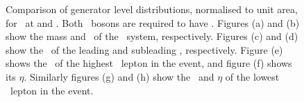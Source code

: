 \begin{figure}
{    }
        \vspace{-2mm}
        \vspace{-2mm}
    \caption[Comparison of generator level distributions, normalised to
    unit area, for \ZZllll\ at  and
    .]{\small Comparison of generator level distributions, normalised to
    unit area, for \ZZllll\ at  and
    . Both \Z\ bosons are required to have \sstooosZ. Figures (a)
    and (b) show the mass and \pt\ of the \ZZ\ system,
    respectively. Figures (c) and (d) show the \pt\ of the
    leading and subleading \Z, respectively. Figure (e) shows the \pt\ of the highest \pt\ lepton in the event, and figure (f) shows its
   $\eta$. Similarly figures (g) and (h) show the \pt\ and $\eta$ of the lowest
   \pt\ lepton in the event.}
    \label{fig:gen-comp-7-8-ZZ}
\end{figure}

